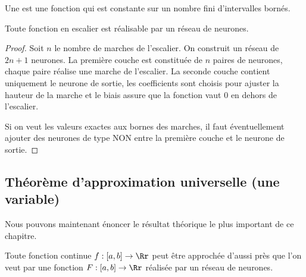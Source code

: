 \documentclass[11pt,class=report,crop=false]{standalone}
\begin{document}
Une  est une fonction qui est constante sur un nombre fini d'intervalles bornés.




\begin{proposition}
Toute fonction en escalier est réalisable par un réseau de neurones.
\end{proposition}

\begin{proof}
Soit $n$ le nombre de marches de l'escalier.
On construit un réseau de $2n+1$ neurones. La première couche est constituée de $n$ paires de neurones, chaque paire réalise une marche de l'escalier. La seconde couche contient uniquement le neurone de sortie, les coefficients sont choisis pour ajuster la hauteur de la marche et le biais assure que la fonction vaut $0$ en dehors de l'escalier.

Si on veut les valeurs exactes aux bornes des marches, il faut éventuellement ajouter des neurones de type \og{}NON\fg{} entre la première couche et le neurone de sortie.
\end{proof}

\subsection{Théorème d'approximation universelle (une variable)}


Nous pouvons maintenant énoncer le résultat théorique le plus important de ce chapitre.

\begin{theoreme}
Toute fonction continue $f : [a,b] \to \Rr$ peut être approchée d'aussi près que l'on veut par une fonction $F : [a,b] \to \Rr$ réalisée par un réseau de neurones.
\end{theoreme}
\end{document}
